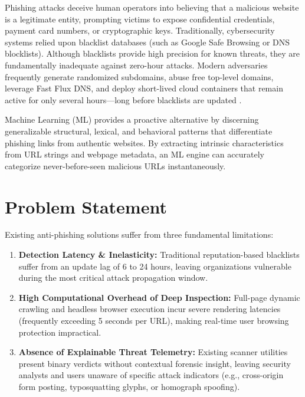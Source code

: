 \documentclass[BTech]{srmuthesis}
\begin{document}
Phishing attacks deceive human operators into believing that a malicious website is a legitimate entity, prompting victims to expose confidential credentials, payment card numbers, or cryptographic keys. Traditionally, cybersecurity systems relied upon blacklist databases (such as Google Safe Browsing or DNS blocklists). Although blacklists provide high precision for known threats, they are fundamentally inadequate against zero-hour attacks. Modern adversaries frequently generate randomized subdomains, abuse free top-level domains, leverage Fast Flux \ac{DNS}, and deploy short-lived cloud containers that remain active for only several hours---long before blacklists are updated \citep{sahingoz2019machine}.

Machine Learning (\ac{ML}) provides a proactive alternative by discerning generalizable structural, lexical, and behavioral patterns that differentiate phishing links from authentic websites. By extracting intrinsic characteristics from \ac{URL} strings and webpage metadata, an \ac{ML} engine can accurately categorize never-before-seen malicious URLs instantaneously.

\section{Problem Statement}
Existing anti-phishing solutions suffer from three fundamental limitations:
\begin{enumerate}
    \item \textbf{Detection Latency \& Inelasticity:} Traditional reputation-based blacklists suffer from an update lag of 6 to 24 hours, leaving organizations vulnerable during the most critical attack propagation window.
    \item \textbf{High Computational Overhead of Deep Inspection:} Full-page dynamic crawling and headless browser execution incur severe rendering latencies (frequently exceeding 5 seconds per URL), making real-time user browsing protection impractical.
    \item \textbf{Absence of Explainable Threat Telemetry:} Existing scanner utilities present binary verdicts without contextual forensic insight, leaving security analysts and users unaware of specific attack indicators (e.g., cross-origin form posting, typosquatting glyphs, or homograph spoofing).
\end{enumerate}
\end{document}
